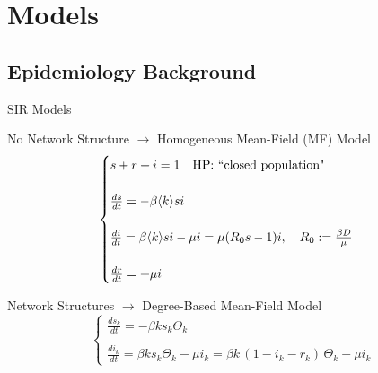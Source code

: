 \documentclass[xcolor={dvipsnames}]{beamer}
\begin{document}
\section{Models}
\subsection{Epidemiology Background}
\begin{frame}{SIR Models}
\vspace{-4mm}
\begin{block}{No Network Structure $\to$ Homogeneous Mean-Field (MF) Model}
	\begin{equation}
		\begin{cases}
			s+r+i = 1 \quad \textnormal{HP: ``closed population"}\\ \\
			\frac{ds}{dt} = -\beta \langle k \rangle s i \\ \\ 
			\frac{di}{dt} = \beta \langle k \rangle s i - \mu i = \mu( R_0 s - 1) i, \quad R_0:= \frac{\beta D}{ \mu}  \label{eq:SIR_MF}	\\ \\
			\frac{dr}{dt} = +\mu i
		\end{cases}
	\end{equation} 
\end{block}
\begin{block}{Network Structures $\to$ Degree-Based Mean-Field Model}
	\begin{equation}
		\begin{cases}
			\frac{ds_k}{dt} = -\beta  k  s_k \Theta_k \\ \\ 
			\frac{di_k}{dt} = \beta  k  s_k \Theta_k - \mu i_k = \beta  k  \, (1-i_k-r_k) \, \Theta_k -\mu i_k \label{eqs:SIR_degree-based}
		\end{cases}	
	\end{equation}
\end{block}
\end{frame}
\end{document}
